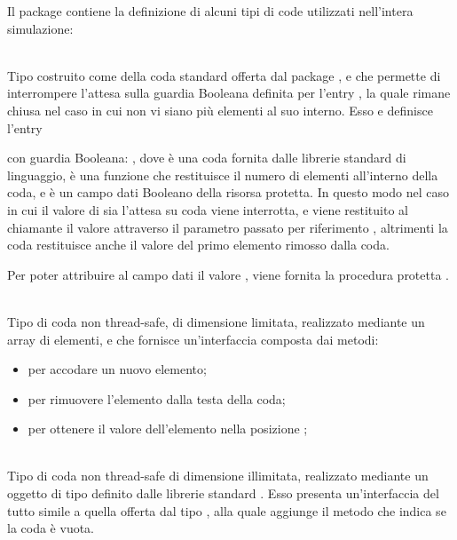 	Il package  contiene la definizione di alcuni tipi di code utilizzati nell'intera simulazione:
		\begin{description}
			\item {} \\
			Tipo  costruito come  della coda standard offerta dal package , e che permette di interrompere l'attesa sulla guardia Booleana definita per l'entry , la quale rimane chiusa nel caso in cui non vi siano più elementi al suo interno.
			Esso e definisce l'entry
			\begin{center}
			\end{center}
		
		con guardia Booleana: , dove  è una coda fornita dalle librerie standard di linguaggio,  è una funzione che restituisce il numero di elementi all'interno della coda, e  è un campo dati Booleano della risorsa protetta. In questo modo nel caso in cui il valore di  sia  l'attesa su coda viene interrotta, e viene restituito al chiamante il valore  attraverso il parametro passato per riferimento , altrimenti la coda restituisce anche il valore del primo elemento rimosso dalla coda.
		
		Per poter attribuire al campo dati  il valore , viene fornita la procedura protetta .
			
			\item {} \\
			Tipo di coda non thread-safe, di dimensione limitata, realizzato mediante un array di elementi, e che fornisce un'interfaccia composta dai metodi:
			\begin{itemize}
				\item {} per accodare un nuovo elemento;
				\item {} per rimuovere l'elemento dalla testa della coda;
				\item {} per ottenere il valore dell'elemento nella posizione ;
			\end{itemize}
			
			\item {} \\
			Tipo di coda non thread-safe di dimensione illimitata, realizzato mediante un oggetto di tipo  definito dalle librerie standard . Esso presenta un'interfaccia del tutto simile a quella offerta dal tipo , alla quale aggiunge il metodo  che indica se la coda è vuota. 
			
		\end{description}
	

